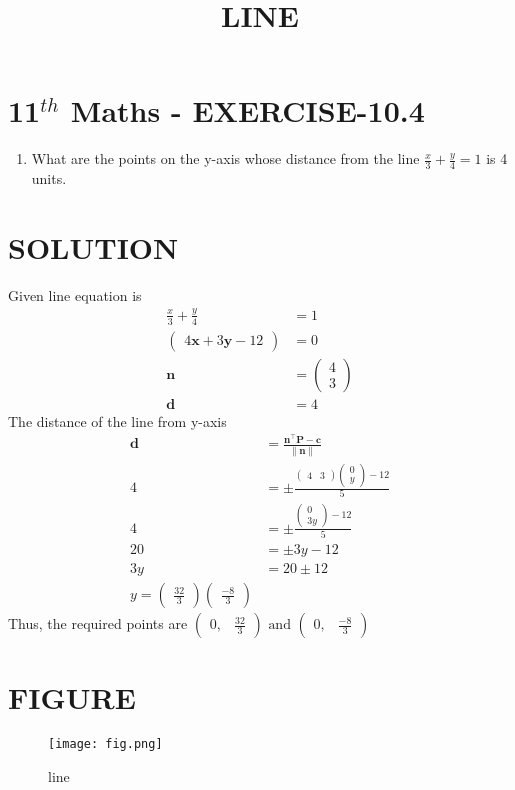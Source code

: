 \documentclass[12pt]{article}
\newcommand{\myvec}[1]{\ensuremath{\begin{pmatrix}#1\end{pmatrix}}}
\providecommand{\norm}[1]{\left\lVert#1\right\rVert}
\let\vec\mathbf
\begin{document}
\begin{center}
\title{\textbf{LINE}}
\date{\vspace{-5ex}} %
\maketitle
\end{center}

\section{11$^{th}$ Maths - EXERCISE-10.4}
\begin{enumerate}
\item What are the points on the y-axis whose distance from the line $\frac{x}{3}+\frac{y}{4}=1$ is 4 units.
\end{enumerate}
\section{SOLUTION}
Given line equation is
\begin{align}
\frac{x}{3}+\frac{y}{4}&=1\\
\myvec{4\vec{x}+3\vec{y}-12}&=0\\
\vec{n}&=\myvec{4\\3}\\
\vec{d}&=4
\end{align}
The distance of the line from y-axis
\begin{align}
\vec{d}&=\frac{\vec{n}^\top\vec{P}-\vec{c}}{\norm{\vec{n}}}\\
4&=\pm \frac{\myvec{4& 3}\myvec{0\\ y}-12}{5}\\
4&=\pm \frac{\myvec{0\\ 3y}-12}{5}\\
20&=\pm 3y-12\\
3y&=20\pm12\\
y=\myvec{\frac{32}{3}} \myvec{\frac{-8}{3}}
\end{align}
Thus, the required points are $\myvec{0,& \frac{32}{3}}\text{ and }\myvec{0,& \frac{-8}{3}}$
\section{FIGURE}
\begin{figure}[h]
\centering
\texttt{[image: fig.png]}
\caption{line}
		\label{fig:Figure}
\end{figure}
\end{document}
